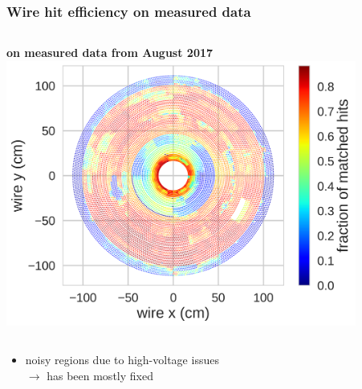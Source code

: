 \documentclass[18pt, aspectratio=169]{beamer}
\newcommand{\kitemph}[1]{\textcolor{kit-green100}{\bf{#1}}}
\begin{document}
\begin{frame}
  \frametitle{Wire hit efficiency on measured data}
  \begin{columns}
    \begin{column}{0.5\textwidth}
      \centering
      \kitemph{on measured data from August 2017}\\
      \includegraphics[width=0.9\textwidth]{figures/hit_efficiency_by_wire/gcr1_2017-08/hit_ratio_matched_by_recotrack.png}
    \end{column}
    \begin{column}{0.5\textwidth}
    \end{column}
  \end{columns}
  \begin{itemize}
  \item noisy regions due to high-voltage issues\\
    $\rightarrow$ has been mostly fixed
  \end{itemize}
\end{frame}
\end{document}
